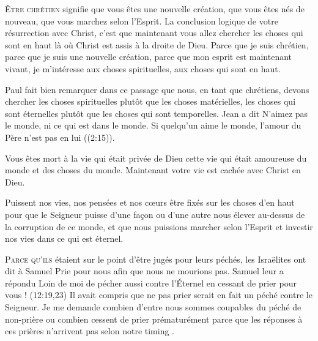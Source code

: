 \lettrine{Ê}{tre chrétien} signifie que vous êtes une nouvelle création,
 que vous êtes nés de nouveau, que vous marchez selon l'Esprit.
 La conclusion logique de votre résurrection avec Christ,
 c'est que maintenant vous allez chercher  les choses
 qui sont en haut là où Christ est assis à la droite de Dieu.
 Parce que je suis chrétien, parce que je suis une nouvelle création,
 parce que mon esprit est maintenant vivant, je m'intéresse aux choses
 spirituelles, aux choses qui sont en haut.


Paul fait bien  remarquer dans ce passage
 que nous, en tant que chrétiens, devons chercher les choses spirituelles
 plutôt que les choses matérielles, les choses qui sont éternelles plutôt
 que les choses qui sont temporelles. Jean a dit\frcolon {}
 \Og N'aimez pas le monde, ni ce qui est dans le monde.
 Si quelqu'un aime le monde, l'amour du Père n'est pas en lui \Fg{}
 ((2:15)). 

Vous êtes mort à la vie qui était privée de Dieu
 \ocadr cette vie qui était amoureuse du monde et des choses du monde.
 Maintenant votre vie est cachée avec Christ en Dieu.

Puissent nos vies, nos pensées et nos c\oe{}urs être fixés
 sur les choses d'en haut \ocadr pour que le Seigneur puisse d'une fa\c{c}on
 ou d'une autre nous élever au-dessus de la corruption de ce monde,
 et que nous puissions marcher selon l'Esprit et investir nos vies
 dans ce qui est éternel.

\dvrule






\lettrine{P}{arce qu'ils} étaient sur le point d'être jugés pour leurs péchés,
 les Israëlites ont dit à Samuel\frcolon {}
 \Og Prie pour nous afin que nous ne mourions pas. \Fg{} 
 Samuel leur a répondu\frcolon {}
 \Og Loin de moi de pécher aussi contre l'Éternel en cessant de prier
 pour vous ! \Fg{}
 (12:19,23)
 Il avait compris que ne pas prier serait en fait un péché contre le Seigneur.
 Je me demande combien d'entre nous sommes coupables du péché de
 \Og non-prière \Fg{} ou combien cessent de prier prématurément
 parce que les réponses à ces prières n'arrivent pas
 selon notre \Og timing \Fg{}.

